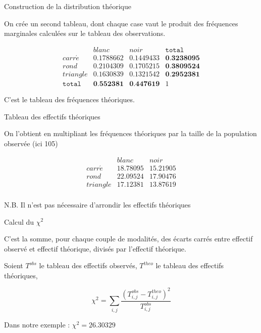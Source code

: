 \documentclass{beamer}
\begin{document}
\begin{frame}{ Construction de la distribution théorique}

On crée un \alert{second tableau}, dont chaque case vaut le produit des fréquences marginales calculées sur le tableau des observations.

$$\begin{array}{c|c|c|c}
   & blanc & noir & \texttt{total}\\ 
   \hline
carr\acute{e} &  0.1788662 &   0.1449433 &  \textbf{0.3238095}\\ 
  \hline
  rond &    0.2104309 &0.1705215 & \textbf{0.3809524}  \\ 
    \hline
  triangle &  0.1630839 & 0.1321542 &   \textbf{0.2952381}\\
  \hline
  \texttt{total} &  \textbf{0.552381} & \textbf{0.447619} & 1
  \end{array}$$

C'est le tableau des \alert{fréquences théoriques}.


\end{frame}


\begin{frame}{ Tableau des effectifs théoriques}

On l'obtient en multipliant les fréquences théoriques par la taille de la population observée (ici 105)


$$\begin{array}{c|c|c}
   & blanc & noir \\ 
   \hline
carr\acute{e} &  18.78095 &  15.21905 \\ 
  \hline
  rond &   22.09524 & 17.90476    \\ 
    \hline
  triangle & 17.12381 & 13.87619   \\
  \end{array}$$

\begin{tiny}
N.B. Il n'est pas nécessaire d'arrondir les effectifs théoriques
\end{tiny}


\end{frame}


\begin{frame}{ Calcul du $\chi^2$ }

C'est la somme, pour chaque couple de modalités,  des écarts carrés entre effectif observé et effectif théorique, divisés par l'effectif théorique.

Soient $T^{obs}$ le tableau des effectifs observés, $T^{theo}$ le tableau des effectifs théoriques, 


$$\chi^2 =  \sum_{i,j}  \frac{( T^{obs}_{i,j} -  T^{theo}_{i,j})^2}{T^{obs}_{i,j}}$$       


\begin{tiny}
Dans notre exemple : $\chi^2 = 26.30329$
\end{tiny}
\end{frame}
\end{document}
